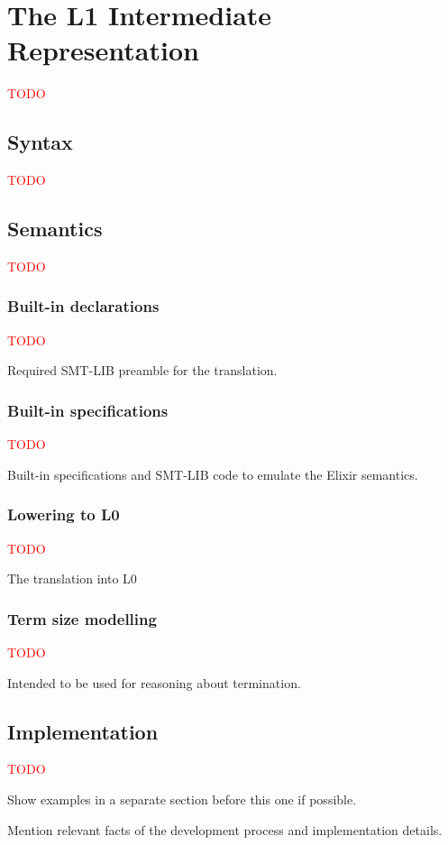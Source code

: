 \chapter{The L1 Intermediate Representation}
\label{cap:intermediateRepresentation}

\textcolor{red}{TODO}

\section{Syntax}

\textcolor{red}{TODO}

\section{Semantics}

\textcolor{red}{TODO}

\subsection{Built-in declarations}

\textcolor{red}{TODO}

Required SMT-LIB preamble for the translation.

\subsection{Built-in specifications}

\textcolor{red}{TODO}

Built-in specifications and SMT-LIB code to emulate the 
Elixir semantics.

\subsection{Lowering to L0}

\textcolor{red}{TODO}

The translation into L0

\subsection{Term size modelling}

\textcolor{red}{TODO}

Intended to be used for reasoning about termination.

\section{Implementation}

\textcolor{red}{TODO}

Show examples in a separate section before this one if possible.

Mention relevant facts of the development process and implementation details.
